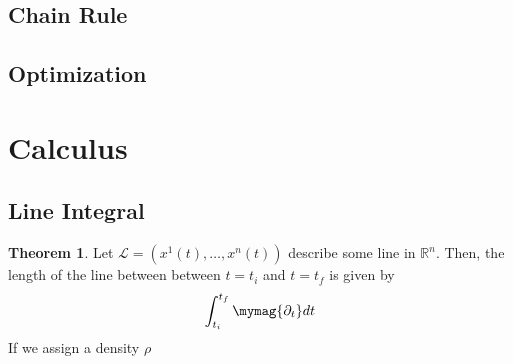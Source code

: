\documentclass[11pt]{article}
\theoremstyle{definition}
\newtheorem{theorem}{Theorem}[section]
\begin{document}
\subsection{Chain Rule}

\subsection{Optimization}

\section{Calculus}
\subsection{Line Integral}
\begin{theorem}
    Let $\mathcal{L} = (x^1(t), \dots, x^n(t))$ describe some line in
    $\mathbb{R}^n$. Then, the length of the line between between $t=t_i$
    and $t=t_f$ is given by
    $$\int_{t_i}^{t_f} \mymag{\partial_t}dt$$
    If we assign a density $\rho$
\end{theorem}
\end{document}
